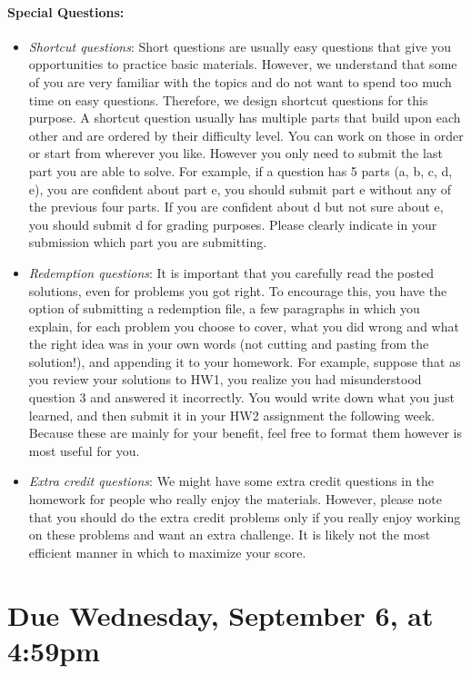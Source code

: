 \documentclass[11pt]{article}
\begin{document}
\paragraph{Special Questions:}
\begin{itemize}
\item {\em Shortcut questions}: Short questions are usually easy questions that give you opportunities to practice basic materials. However, we understand that some of you are very familiar with the topics and do not want to spend too much time on easy questions. Therefore, we design shortcut questions for this purpose. A shortcut question usually has multiple parts that build upon each other and are ordered by their difficulty level. You can work on those in order or start from wherever you like. However you only need to submit the last part you are able to solve. For example, if a question has 5 parts (a, b, c, d, e), you are confident about part e, you should submit part e without any of the previous four parts. If you are confident about d but not sure about e, you should submit d for grading purposes. Please clearly indicate in your submission which part you are submitting.
\item {\em Redemption questions}: It is important that you carefully read the posted solutions, even for problems you got right. To encourage this, you have the option of submitting a redemption file, a few paragraphs in which you explain, for each problem you choose to cover, what you did wrong and what the right idea was in your own words (not cutting and pasting from the solution!), and appending it to your homework. For example, suppose that as you review your solutions to HW1, you realize you had misunderstood question 3 and answered it incorrectly. You would write down what you just learned, and then submit it in your HW2 assignment the following week. Because these are mainly for your benefit, feel free to format them however is most useful for you.
\item {\em Extra credit questions}: We might have some extra credit questions in the homework for people who really enjoy the materials. However, please note that you should do the extra credit problems only if you really enjoy working on these problems and want an extra challenge. It is likely not the most efficient manner in which to maximize your score.
\end{itemize}

\newpage
\section*{Due Wednesday, September 6, at 4:59pm} 


\end{document}

